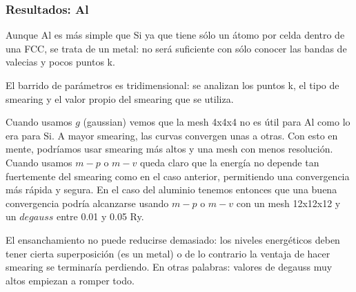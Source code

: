 \subsubsection{Resultados: Al}

Aunque Al es más simple que Si ya que tiene sólo un átomo por celda dentro de una FCC, se trata de un metal: no será suficiente con sólo conocer las bandas de valecias y pocos puntos k.

El barrido de parámetros es tridimensional: se analizan los puntos k, el tipo de smearing y el valor propio del smearing que se utiliza.

Cuando usamos $g$ (gaussian) vemos que la mesh 4x4x4 no es útil para Al como lo era para Si. A mayor smearing, las curvas convergen unas a otras. Con esto en mente, podríamos usar smearing más altos y una mesh con menos resolución. Cuando usamos $m-p$ o $m-v$ queda claro que la energía no depende tan fuertemente del smearing como en el caso anterior, permitiendo una convergencia más rápida y segura. En el caso del aluminio tenemos entonces que una buena convergencia podría alcanzarse usando $m-p$ o $m-v$ con un mesh 12x12x12 y un $degauss$ entre 0.01 y 0.05 Ry.

El ensanchamiento no puede reducirse demasiado: los niveles energéticos deben tener cierta superposición (es un metal) o de lo contrario la ventaja de hacer smearing se terminaría perdiendo. En otras palabras: valores de degauss muy altos empiezan a romper todo.

